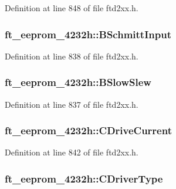 Definition at line 848 of file ftd2xx.h.\hypertarget{structft__eeprom__4232h_a8bb143cc9d051960d4aa6fc9be3230d4}{
\subsubsection[{BSchmittInput}]{ {\bf ft\_\-eeprom\_\-4232h::BSchmittInput}}}
\label{structft__eeprom__4232h_a8bb143cc9d051960d4aa6fc9be3230d4}


Definition at line 838 of file ftd2xx.h.\hypertarget{structft__eeprom__4232h_acd3e611ccee7fc8be7c459e6a436efda}{
\subsubsection[{BSlowSlew}]{ {\bf ft\_\-eeprom\_\-4232h::BSlowSlew}}}
\label{structft__eeprom__4232h_acd3e611ccee7fc8be7c459e6a436efda}


Definition at line 837 of file ftd2xx.h.\hypertarget{structft__eeprom__4232h_a28fd0e83320d2b18d8e3494f019e8f4c}{
\subsubsection[{CDriveCurrent}]{ {\bf ft\_\-eeprom\_\-4232h::CDriveCurrent}}}
\label{structft__eeprom__4232h_a28fd0e83320d2b18d8e3494f019e8f4c}


Definition at line 842 of file ftd2xx.h.\hypertarget{structft__eeprom__4232h_af1da86c7d0ff4bb811627c5d84c5ce79}{
\subsubsection[{CDriverType}]{ {\bf ft\_\-eeprom\_\-4232h::CDriverType}}}
\label{structft__eeprom__4232h_af1da86c7d0ff4bb811627c5d84c5ce79}


